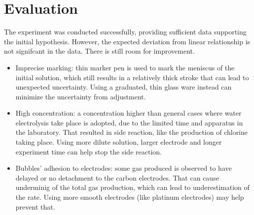 \documentclass[a4paper]{article}
\begin{document}
\section{Evaluation}
\label{sec.eval}

The experiment was conducted successfully, providing sufficient data supporting the initial hypothesis. However, the expected deviation from linear relationship is not signifcant in the data. There is still room for improvement.

\begin{itemize}
    \item Imprecise marking: thin marker pen is used to mark the meniscus of the initial solution, which still results in a relatively thick stroke that can lead to unexpected uncertainty. Using a graduated, thin glass ware instead can minimize the uncertainty from adjustment.
    \item High concentration: a concentration higher than general cases where water electrolysis take place is adopted, due to the limited time and apparatus in the laboratory. That resulted in side reaction, like the production of chlorine taking place. Using more dilute solution, larger electrode and longer experiment time can help stop the side reaction.
    \item Bubbles' adhesion to electrodes: some gas produced is observed to have delayed or no detachment to the carbon electrodes. That can cause underminig of the total gas production, which can lead to underestimation of the rate. Using more smooth electrodes (like platinum electrodes) may help prevent that.
\end{itemize}



\end{document}
